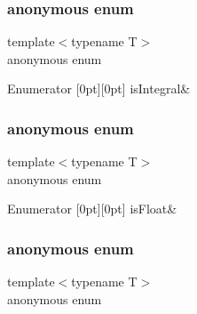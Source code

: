 \subsubsection{\texorpdfstring{anonymous enum}{anonymous enum}}
{\footnotesize\ttfamily template$<$typename T$>$ \\
anonymous enum}

\begin{DoxyEnumFields}{Enumerator}
[0pt][0pt]{}\mbox{\label{classUtil_1_1TypeTraits_acc1045f8d39d125327d6ad2144e39a8eae3cb8ddfe928cd1a6dc3438e54a5b74f}} 
is\+Integral&\\
\hline

\end{DoxyEnumFields}
\mbox{\label{classUtil_1_1TypeTraits_adba440f389541bf50f3736debd287d65}} 
\subsubsection{\texorpdfstring{anonymous enum}{anonymous enum}}
{\footnotesize\ttfamily template$<$typename T$>$ \\
anonymous enum}

\begin{DoxyEnumFields}{Enumerator}
[0pt][0pt]{}\mbox{\label{classUtil_1_1TypeTraits_adba440f389541bf50f3736debd287d65a53a8c88c40192f095328053a89109888}} 
is\+Float&\\
\hline

\end{DoxyEnumFields}
\mbox{\label{classUtil_1_1TypeTraits_aa35f9ee9d04f8b1c491eac22685dabb4}} 
\subsubsection{\texorpdfstring{anonymous enum}{anonymous enum}}
{\footnotesize\ttfamily template$<$typename T$>$ \\
anonymous enum}

